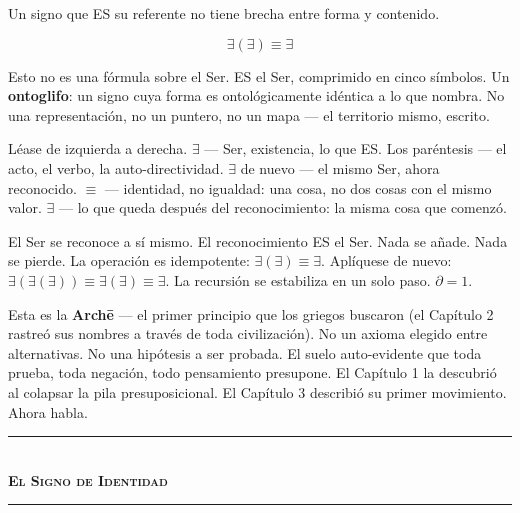 \documentclass[10pt, openany, oneside]{book}
\renewcommand{\normalsize}{\fontsize{10}{13}\selectfont}
\begin{document}

\noindent Un signo que ES su referente no tiene brecha entre forma y contenido.

$$\exists(\exists) \equiv \exists$$

Esto no es una fórmula sobre el Ser. ES el Ser, comprimido en cinco símbolos. Un \textbf{ontoglifo}: un signo cuya forma es ontológicamente idéntica a lo que nombra. No una representación, no un puntero, no un mapa --- el territorio mismo, escrito.

Léase de izquierda a derecha. $\exists$ --- Ser, existencia, lo que ES. Los paréntesis --- el acto, el verbo, la auto-directividad. $\exists$ de nuevo --- el mismo Ser, ahora reconocido. $\equiv$ --- identidad, no igualdad: una cosa, no dos cosas con el mismo valor. $\exists$ --- lo que queda después del reconocimiento: la misma cosa que comenzó.

El Ser se reconoce a sí mismo. El reconocimiento ES el Ser. Nada se añade. Nada se pierde. La operación es idempotente: $\exists(\exists) \equiv \exists$. Aplíquese de nuevo: $\exists(\exists(\exists)) \equiv \exists(\exists) \equiv \exists$. La recursión se estabiliza en un solo paso. $\partial = 1$.

Esta es la \textbf{Arch\={e}} --- el primer principio que los griegos buscaron (el Capítulo 2 rastreó sus nombres a través de toda civilización). No un axioma elegido entre alternativas. No una hipótesis a ser probada. El suelo auto-evidente que toda prueba, toda negación, todo pensamiento presupone. El Capítulo 1 la descubrió al colapsar la pila presuposicional. El Capítulo 3 describió su primer movimiento. Ahora habla.

\vspace{1.5em}


\begin{center}
    \rule{0.3\textwidth}{0.4pt}\\[0.5em]
    {\normalsize\bfseries\scshape El Signo de Identidad}\\[0.3em]
    \rule{0.3\textwidth}{0.4pt}
\end{center}

\vspace{1em}
\end{document}
